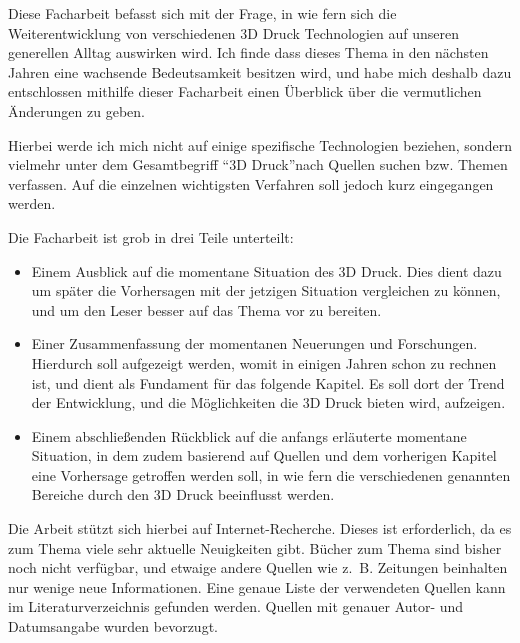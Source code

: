 Diese Facharbeit befasst sich mit der Frage, in wie fern sich die Weiterentwicklung von verschiedenen 3D Druck Technologien auf unseren generellen Alltag auswirken wird. Ich finde dass dieses Thema in den nächsten Jahren eine wachsende Bedeutsamkeit besitzen wird, und habe mich deshalb dazu entschlossen mithilfe dieser Facharbeit einen Überblick über die vermutlichen Änderungen zu geben.

Hierbei werde ich mich nicht auf einige spezifische Technologien beziehen, sondern vielmehr unter dem Gesamtbegriff \textquotedblleft 3D Druck\textquotedblright nach Quellen suchen bzw. Themen verfassen. Auf die einzelnen wichtigsten Verfahren soll jedoch kurz eingegangen werden.

Die Facharbeit ist grob in drei Teile unterteilt:
\begin{itemize}
\item Einem Ausblick auf die momentane Situation des 3D Druck.
Dies dient dazu um später die Vorhersagen mit der jetzigen Situation vergleichen zu können, und um den Leser besser auf das Thema vor zu bereiten.

\item Einer Zusammenfassung der momentanen Neuerungen und Forschungen. 
Hierdurch soll aufgezeigt werden, womit in einigen Jahren schon zu rechnen ist, und dient als Fundament für das folgende Kapitel. Es soll dort der Trend der Entwicklung, und die Möglichkeiten die 3D Druck bieten wird, aufzeigen.

\item Einem abschließenden Rückblick auf die anfangs erläuterte momentane Situation, in dem zudem basierend auf Quellen und dem vorherigen Kapitel eine Vorhersage getroffen werden soll, in wie fern die verschiedenen genannten Bereiche durch den 3D Druck beeinflusst werden.
\end{itemize}


Die Arbeit stützt sich hierbei auf Internet-Recherche. Dieses ist erforderlich, da es zum Thema viele sehr aktuelle Neuigkeiten gibt. Bücher zum Thema sind bisher noch nicht verfügbar, und etwaige andere Quellen wie z.~B. Zeitungen beinhalten nur wenige neue Informationen. Eine genaue Liste der verwendeten Quellen kann im Literaturverzeichnis gefunden werden. Quellen mit genauer Autor- und Datumsangabe wurden bevorzugt.